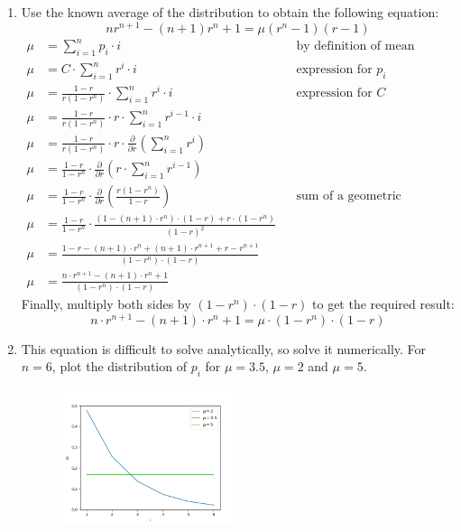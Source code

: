 \documentclass[10pt,\jkfside,a4paper]{article}
\begin{document}
\begin{enumerate}
\begin{enumerate}
        \item Use the known average of the distribution to obtain the following equation:
        \[
            n r^{n + 1} - (n + 1) r^n + 1 = \mu (r^n - 1)(r - 1)
        \]
        \begin{align}
            \mu &= \sum^n_{i = 1} p_i \cdot i && \text{by definition of mean} \\
            \mu &= C \cdot \sum^n_{i = 1} r^i \cdot i && \text{expression for $p_i$} \\
            \mu &= \frac{1 - r}{r(1 - r^n)} \cdot \sum^n_{i = 1} r^i \cdot i && \text{expression for $C$} \\
            \mu &= \frac{1 - r}{r(1 - r^n)} \cdot r \cdot \sum^n_{i = 1} r^{i - 1} \cdot i \\
            \mu &= \frac{1 - r}{r(1 - r^n)} \cdot r \cdot \frac{\partial}{\partial r}\left(\sum^n_{i = 1} r^i\right) \\
            \mu &= \frac{1 - r}{1 - r^n} \cdot \frac{\partial}{\partial r}\left(r \cdot \sum^{n}_{i = 1} r^{i - 1}\right) \\
            \mu &= \frac{1 - r}{1 - r^n} \cdot \frac{\partial}{\partial r}\left(\frac{r(1 - r^n)}{1 - r}\right) && \text{sum of a geometric sequence} \\
            \mu &= \frac{1 - r}{1 - r^n} \cdot \frac{(1 - (n + 1) \cdot r^n) \cdot (1 - r) + r \cdot (1 - r^n)}{(1 - r)^2} \\
            \mu &= \frac{1 - r - (n + 1) \cdot r^n + (n + 1) \cdot r^{n + 1} + r - r^{n + 1}}{(1 - r^n) \cdot (1 - r)} \\
            \mu &= \frac{n \cdot r^{n + 1} - (n + 1) \cdot r^n + 1}{(1 - r^n) \cdot (1 - r)}
        \end{align}
        Finally, multiply both sides by $(1 - r^n) \cdot (1 - r)$ to get the required result:
        \[
            n \cdot r^{n + 1} - (n + 1) \cdot r^n + 1 = \mu \cdot (1 - r^n) \cdot (1 - r)
        \]

        \item This equation is difficult to solve analytically, so solve it numerically. For $n = 6$, plot the distribution of $p_i$ for $\mu = 3.5$, $\mu = 2$ and $\mu = 5$.

        \begin{figure}[H]

            \centering

            \includegraphics[width=0.5\textwidth]{plot}


\end{figure}
\end{enumerate}
\end{enumerate}
\end{document}
